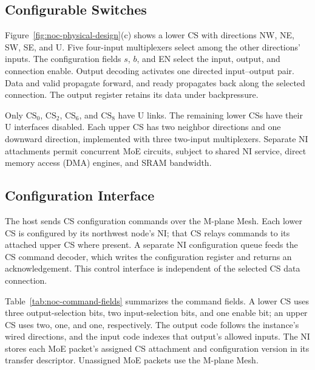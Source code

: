 \documentclass[conference,10pt]{IEEEtran}
\begin{document}
\subsection{Configurable Switches}
\label{sec:noc-switches}

Figure~\ref{fig:noc-physical-design}(c) shows a lower CS with directions
NW, NE, SW, SE, and U. Five four-input multiplexers select among the
other directions' inputs. The configuration fields $s$, $b$, and EN
select the input, output, and connection enable. Output decoding
activates one directed input--output pair. Data and valid propagate
forward, and ready propagates back along the selected connection.
The output register retains its data under backpressure.

Only $\mathrm{CS}_0$, $\mathrm{CS}_2$, $\mathrm{CS}_6$, and
$\mathrm{CS}_8$ have U links. The remaining lower CSs have their U
interfaces disabled. Each upper CS has two neighbor directions and
one downward direction, implemented with three two-input multiplexers.
Separate NI attachments permit concurrent MoE circuits, subject to
shared NI service, direct memory access (DMA) engines, and SRAM bandwidth.



\subsection{Configuration Interface}
\label{sec:noc-config-interface}

The host sends CS configuration commands over the M-plane Mesh.
Each lower CS is configured by its northwest node's NI; that CS relays
commands to its attached upper CS where present. A separate NI
configuration queue feeds the CS command decoder, which writes the
configuration register and returns an acknowledgement. This control
interface is independent of the selected CS data connection.

Table~\ref{tab:noc-command-fields} summarizes the command fields.
A lower CS uses three output-selection bits, two input-selection bits,
and one enable bit; an upper CS uses two, one, and one, respectively.
The output code follows the instance's wired directions, and the input
code indexes that output's allowed inputs. The NI stores each MoE
packet's assigned CS attachment and configuration version in its
transfer descriptor. Unassigned MoE packets use the M-plane Mesh.
\end{document}
